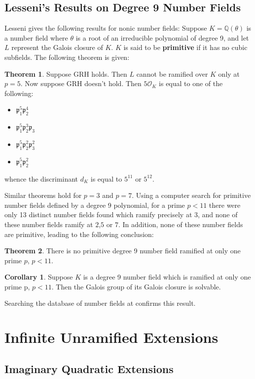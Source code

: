 \documentclass[12pt]{extarticle}
\newcommand{\Q}{\mathbb{Q}}
\newcommand{\<}{\langle}
\renewcommand{\>}{\rangle}
\theoremstyle{definition}
\newtheorem{theorem}{Theorem}
\newtheorem{corollary}{Corollary}
\begin{document}
\subsection{Lesseni's Results on Degree 9 Number Fields}
Lesseni \cite{LESSENI} gives the following results for nonic number fields:
Suppose $K=\Q(\theta)$ is a number field where $\theta$ is a root of an irreducible polynomial of degree 9, and let $L$ represent the Galois closure of $K$. $K$ is said to be \textbf{primitive} if it has no cubic subfields. The following theorem is given:
 \begin{theorem}
    Suppose GRH holds. Then $L$ cannot be ramified over $K$ only at $p=5$. Now suppose GRH doesn't hold. Then $5\mathcal{O}_K$ is equal to one of the following: \begin{itemize}
        \item $\mathfrak{p}_1^5\mathfrak{p}_2^4$
        \item $\mathfrak{p}_1^5\mathfrak{p}_2^3\mathfrak{p}_3$
        \item $\mathfrak{p}_1^5\mathfrak{p}_2^2\mathfrak{p}_3^2$
        \item  $\mathfrak{p}_1^5\mathfrak{p}_2^2$
    \end{itemize}
    whence the discriminant $d_K$ is equal to $5^{11}$ or $5^{12}$. 
\end{theorem}
Similar theorems hold for $p=3$ and $p=7$.  Using a computer search for primitive number fields defined by a degree 9 polynomial, for a prime $p<11$ there were only 13 distinct number fields found which ramify precisely at $3$, and none of these number fields ramify at $2$,$5$ or $7$. In addition, none of these number fields are primitive, leading to the following conclusion:
\begin{theorem}
    There is no primitive degree 9 number field ramified at only one prime $p$, $p<11$.
\end{theorem}
\begin{corollary}
 Suppose $K$ is a degree 9 number field which is ramified at only one prime p, $p<11$. Then the Galois group of its Galois closure is solvable. 
\end{corollary}
Searching the database of number fields at \cite{JONE2} confirms this result. 



\section{Infinite Unramified Extensions}
\subsection{Imaginary Quadratic Extensions}
\end{document}
